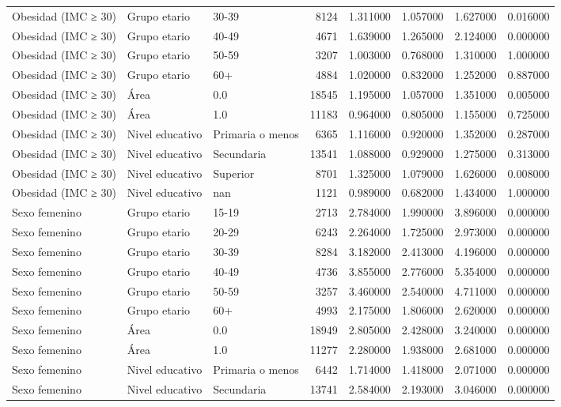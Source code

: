 \begin{longtable}{lllrrrrr}
Obesidad (IMC ≥ 30) & Grupo etario & 30-39 & 8124 & 1.311000 & 1.057000 & 1.627000 & 0.016000 \\
Obesidad (IMC ≥ 30) & Grupo etario & 40-49 & 4671 & 1.639000 & 1.265000 & 2.124000 & 0.000000 \\
Obesidad (IMC ≥ 30) & Grupo etario & 50-59 & 3207 & 1.003000 & 0.768000 & 1.310000 & 1.000000 \\
Obesidad (IMC ≥ 30) & Grupo etario & 60+ & 4884 & 1.020000 & 0.832000 & 1.252000 & 0.887000 \\
Obesidad (IMC ≥ 30) & Área & 0.0 & 18545 & 1.195000 & 1.057000 & 1.351000 & 0.005000 \\
Obesidad (IMC ≥ 30) & Área & 1.0 & 11183 & 0.964000 & 0.805000 & 1.155000 & 0.725000 \\
Obesidad (IMC ≥ 30) & Nivel educativo & Primaria o menos & 6365 & 1.116000 & 0.920000 & 1.352000 & 0.287000 \\
Obesidad (IMC ≥ 30) & Nivel educativo & Secundaria & 13541 & 1.088000 & 0.929000 & 1.275000 & 0.313000 \\
Obesidad (IMC ≥ 30) & Nivel educativo & Superior & 8701 & 1.325000 & 1.079000 & 1.626000 & 0.008000 \\
Obesidad (IMC ≥ 30) & Nivel educativo & nan & 1121 & 0.989000 & 0.682000 & 1.434000 & 1.000000 \\
Sexo femenino & Grupo etario & 15-19 & 2713 & 2.784000 & 1.990000 & 3.896000 & 0.000000 \\
Sexo femenino & Grupo etario & 20-29 & 6243 & 2.264000 & 1.725000 & 2.973000 & 0.000000 \\
Sexo femenino & Grupo etario & 30-39 & 8284 & 3.182000 & 2.413000 & 4.196000 & 0.000000 \\
Sexo femenino & Grupo etario & 40-49 & 4736 & 3.855000 & 2.776000 & 5.354000 & 0.000000 \\
Sexo femenino & Grupo etario & 50-59 & 3257 & 3.460000 & 2.540000 & 4.711000 & 0.000000 \\
Sexo femenino & Grupo etario & 60+ & 4993 & 2.175000 & 1.806000 & 2.620000 & 0.000000 \\
Sexo femenino & Área & 0.0 & 18949 & 2.805000 & 2.428000 & 3.240000 & 0.000000 \\
Sexo femenino & Área & 1.0 & 11277 & 2.280000 & 1.938000 & 2.681000 & 0.000000 \\
Sexo femenino & Nivel educativo & Primaria o menos & 6442 & 1.714000 & 1.418000 & 2.071000 & 0.000000 \\
Sexo femenino & Nivel educativo & Secundaria & 13741 & 2.584000 & 2.193000 & 3.046000 & 0.000000 \\

\end{longtable}
